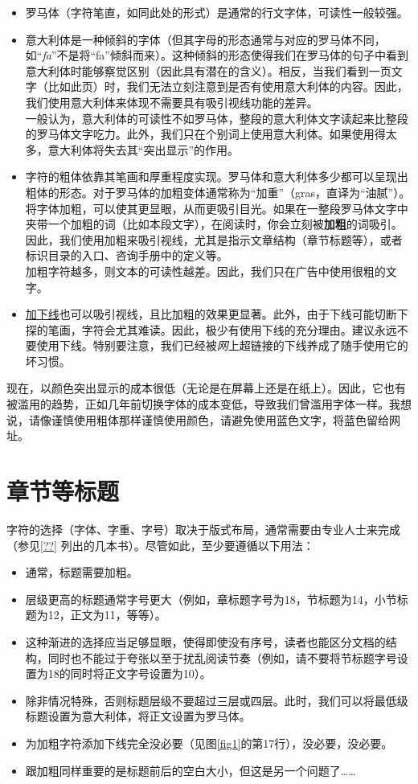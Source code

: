 \begin{itemize}
    \item 罗马体（字符笔直，如同此处的形式）是通常的行文字体，可读性一般较强。
    \item 意大利体是一种倾斜的字体（但其字母的形态通常与对应的罗马体不同，如“\emph{fa}”不是将“fa”倾斜而来）。这种倾斜的形态使得我们在罗马体的句子中看到意大利体时能够察觉区别（因此具有潜在的含义）。相反，当我们看到一页文字（比如此页）时，我们无法立刻注意到是否有使用意大利体的内容。因此，我们使用意大利体来体现不需要具有吸引视线功能的差异。\\
    一般认为，意大利体的可读性不如罗马体，整段的意大利体文字读起来比整段的罗马体文字吃力。此外，我们只在个别词上使用意大利体。如果使用得太多，意大利体将失去其“突出显示”的作用。
    \item 字符的粗体依靠其笔画和厚重程度实现。罗马体和意大利体多少都可以呈现出粗体的形态。对于罗马体的加粗变体通常称为“加重”（gras，直译为“油腻”）。将字体加粗，可以使其更显眼，从而更吸引目光。如果在一整段罗马体文字中夹带一个加粗的词（比如本段文字），在阅读时，你会立刻被\textbf{加粗}的词吸引。因此，我们使用加粗来吸引视线，尤其是指示文章结构（章节标题等），或者标识目录的入口、咨询手册中的定义等。\\
    加粗字符越多，则文本的可读性越差。因此，我们只在广告中使用很粗的文字。
    \item \underline{加下线}也可以吸引视线，且比加粗的效果更显著。此外，由于下线可能切断下探的笔画，字符会尤其难读。因此，极少有使用下线的充分理由。建议永远不要使用下线。特别要注意，我们已经被\emph{网}上超链接的下线养成了随手使用它的坏习惯。
\end{itemize}

现在，以颜色突出显示的成本很低（无论是在屏幕上还是在纸上）。因此，它也有被滥用的趋势，正如几年前切换字体的成本变低，导致我们曾滥用字体一样。我想说，请像谨慎使用粗体那样谨慎使用颜色，请避免使用蓝色文字，将蓝色留给网址。

\section{章节等标题}

字符的选择（字体、字重、字号）取决于版式布局，通常需要由专业人士来完成（参见\ref{??}%
列出的几本书）。尽管如此，至少要遵循以下用法：

\begin{itemize}
    \item 通常，标题需要加粗。
    \item 层级更高的标题通常字号更大（例如，章标题字号为18，节标题为14，小节标题为12，正文为11，等等）。
    \item 这种渐进的选择应当足够显眼，使得即使没有序号，读者也能区分文档的结构，同时也不能过于夸张以至于扰乱阅读节奏（例如，请不要将节标题字号设置为18的同时将正文字号设置为10）。
    \item 除非情况特殊，否则标题层级不要超过三层或四层。此时，我们可以将最低级标题设置为意大利体，将正文设置为罗马体。
    \item 为加粗字符添加下线完全没必要（见图\ref{fig1}的第17行），没必要，没必要。
    \item 跟加粗同样重要的是标题前后的空白大小，但这是另一个问题了……
\end{itemize}

